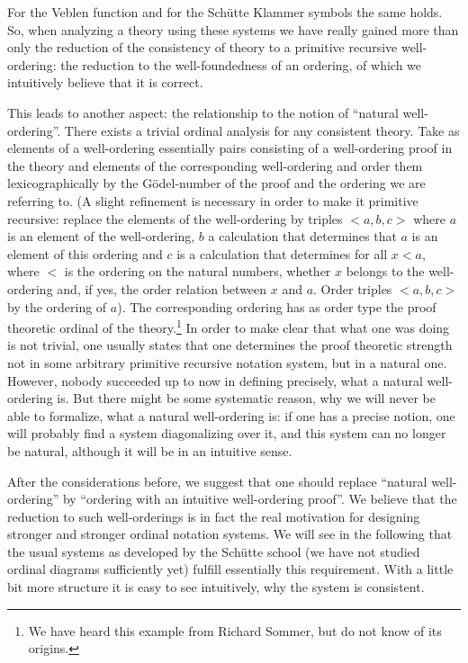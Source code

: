 \documentclass[10pt]{article}
\def\seq#1{\mathopen{<}#1\mathclose{>}}
\begin{document}
For the Veblen function and for
the Sch{\"u}tte Klammer symbols the same holds. So, when 
analyzing a theory using these systems 
we have
really gained more than only the reduction of the consistency of theory
to a primitive recursive well-ordering: the reduction to the
well-foundedness of an ordering, of which we intuitively believe that it is
correct.\par 
This leads to another aspect: the relationship to the notion of 
``natural well-ordering''. There exists a trivial ordinal analysis for any
consistent theory. Take as elements of a well-ordering 
essentially pairs consisting of a 
well-ordering proof in the theory and elements of the 
corresponding well-ordering 
and order them lexicographically by
the G{\"o}del-number of the proof and the ordering we are
referring to. (A slight refinement
is necessary in order to make it primitive recursive: replace the
elements of the well-ordering by triples $\seq{a,b,c}$ where
$a$ is an element of the well-ordering, $b$ a calculation that
determines that $a$ is an element of this ordering and
$c$ is a calculation that determines for all $x<a$, where
$<$ is the ordering on the natural numbers, whether $x$ belongs
to the well-ordering and, if yes, the order relation between
$x$ and $a$. Order triples $\seq{a,b,c}$ by the 
ordering of $a$).
The corresponding ordering has as order type the proof theoretic
ordinal of the theory.\footnote{We have heard this example from
Richard Sommer, but do not know of its origins.}
In order to make clear that what one was
doing is not trivial, one usually states that 
one determines the proof theoretic strength not in some arbitrary
primitive  recursive notation system, but in a natural one.
However, nobody succeeded up to now in defining precisely, 
what a natural well-ordering is. But there might be some systematic
reason, why we will never be able to 
formalize, what a natural well-ordering is: if one has a precise
notion, one will probably find a system diagonalizing over it, and this
system can no longer be natural, although it will be in an intuitive sense.\par 
After the considerations before, we suggest that 
one should replace ``natural well-ordering'' by ``ordering with an
intuitive well-ordering proof''.
We believe that the reduction to such well-orderings  is in fact the 
real motivation for designing stronger and stronger ordinal notation systems.
We will see in the following that the usual systems as developed
by the Sch{\"u}tte school (we have not studied ordinal diagrams 
sufficiently yet)
fulfill essentially this requirement.
With a little bit more structure it is easy to see intuitively, why the
system is consistent.
\end{document}
